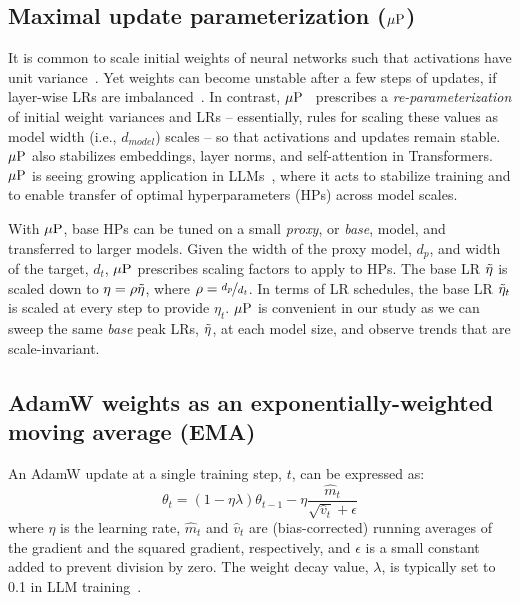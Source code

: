 \subsection{Maximal update parameterization ($\mbox{$\mu$P}$)}\label{subsec:mup}

It is common to scale initial weights of neural networks such that
activations have unit
variance~\citep{glorot2010initialization,he2015delving}.  Yet weights
can become unstable after a few steps of updates, if layer-wise LRs
are imbalanced~\citep{yang2022mup}.
In contrast, $\mbox{$\mu$P}$~\citep{yang2020feature,dey2024practitioner}
prescribes a \emph{re-parameterization} of initial weight variances
and LRs -- essentially, rules for scaling these values as model width
(i.e., $d_{model}$) scales -- so that activations and updates remain
stable.
%
$\mbox{$\mu$P}$ also stabilizes embeddings, layer norms, and self-attention in
Transformers.
%
$\mbox{$\mu$P}$ is seeing growing application in
LLMs~\citep{dey2023cerebras,shen2024power,hu2024minicpm}, where it
acts to stabilize training and to enable transfer of optimal
hyperparameters (HPs) across model scales.

With $\mbox{$\mu$P}$, base HPs can be tuned on a small \emph{proxy}, or
\emph{base}, model, and transferred to larger models.  Given the width
of the proxy model, $d_p$, and width of the target, $d_t$, $\mbox{$\mu$P}$
prescribes scaling factors to apply to HPs. The base LR $\tilde{\eta}$ is
scaled down to $\eta = \rho\tilde{\eta}$, where $\rho=\nicefrac{d_p}{d_t}$.
In terms of LR schedules, the base LR $\tilde{\eta}_t$ is scaled at every
step to provide $\eta_t$.  $\mbox{$\mu$P}$ is convenient in our study as we can
sweep the same \emph{base} peak LRs, $\tilde{\eta}$, at each model size,
and observe trends that are scale-invariant.

\subsection{AdamW weights as an exponentially-weighted moving average (EMA)}\label{subsec:wang}

An AdamW update at a single training step, $t$, can be expressed as:
\begin{equation}
\theta_t = (1 - \eta\lambda)\theta_{t-1} - \eta \frac{\hat{m}_t}{\sqrt{\hat{v}_t} + \epsilon}\label{eqn:adamw}
\end{equation}
where $\eta$ is the learning rate, $\hat{m}_t$ and $\hat{v}_t$ are
(bias-corrected) running averages of the gradient and the squared
gradient, respectively, and $\epsilon$ is a small constant added to
prevent division by zero.  The weight decay value, $\lambda$, is
typically set to 0.1 in LLM
training~\citep{brown2020language,hoffmann2022empirical,almazrouei2023falcon,alephalpha2024introducing}.


